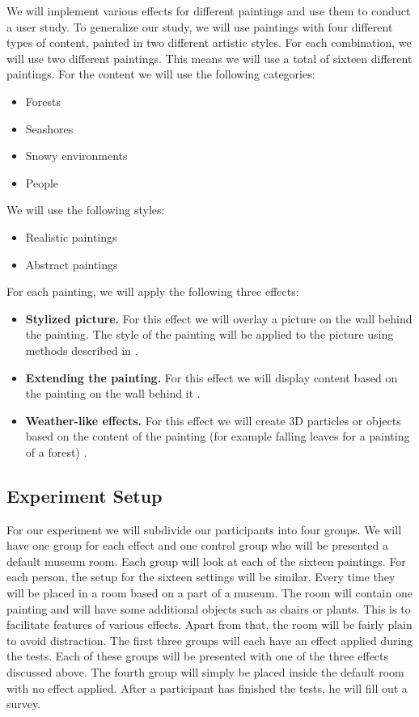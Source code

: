 \documentclass[a4paper]{article}
\begin{document}
We will implement various effects for different paintings and use them to conduct a user study. To generalize our study, we will use paintings with four different types of content, painted in two different artistic styles. For each combination, we will use two different paintings. This means we will use a total of sixteen different paintings. For the content we will use the following categories:

\begin{itemize}
\item Forests
\item Seashores
\item Snowy environments
\item People
\end{itemize}
We will use the following styles:

\begin{itemize}
\item Realistic paintings
\item Abstract paintings
\end{itemize}
For each painting, we will apply the following three effects:

\begin{itemize}
\item \textbf{Stylized picture.} For this effect we will overlay a picture on the wall behind the painting. The style of the painting will be applied to the picture using methods described in \cite{gatys}.
\item \textbf{Extending the painting.} For this effect we will display content based on the painting on the wall behind it \cite{inpainting}.
\item \textbf{Weather-like effects.} For this effect we will create 3D particles or objects based on the content of the painting (for example falling leaves for a painting of a forest) \cite{illumiroom}.
\end{itemize}

\subsection{Experiment Setup}

For our experiment we will subdivide our participants into four groups. We will have one group for each effect and one control group who will be presented a default museum room. Each group will look at each of the sixteen paintings. For each person, the setup for the sixteen settings will be similar. Every time they will be placed in a room based on a part of a museum. The room will contain one painting and will have some additional objects such as chairs or plants. This is to facilitate features of various effects. Apart from that, the room will be fairly plain to avoid distraction. The first three groups will each have an effect applied during the tests. Each of these groups will be presented with one of the three effects discussed above. The fourth group will simply be placed inside the default room with no effect applied. After a participant has finished the tests, he will fill out a survey.
\end{document}
